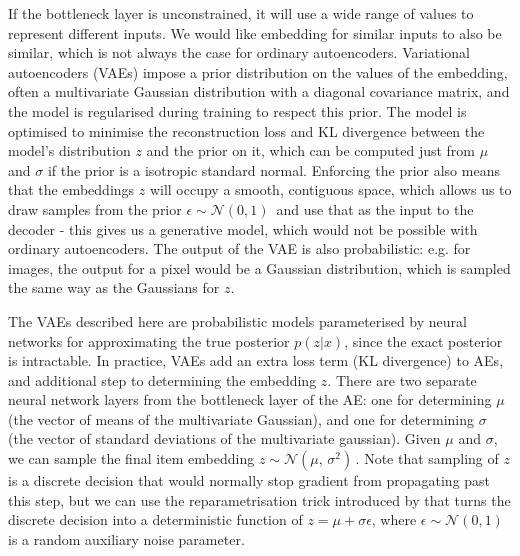 If the bottleneck layer is unconstrained, it will use a wide range of values to represent different inputs.
We would like embedding for similar inputs to also be similar, which is not always the case for ordinary autoencoders.
Variational autoencoders (VAEs) impose a prior distribution on the values of the embedding, often a multivariate Gaussian distribution with a diagonal covariance matrix, and the model is regularised during training to respect this prior.
The model is optimised to minimise the reconstruction loss and KL divergence between the model's distribution $z$ and the prior on it, which can be computed just from $\mu$ and $\sigma$ if the prior is a isotropic standard normal.
Enforcing the prior also means that the embeddings $z$ will occupy a smooth, contiguous space, which allows us to draw samples from the prior $\epsilon \sim \mathcal{N}(0, 1)\,$ and use that as the input to the decoder - this gives us a generative model, which would not be possible with ordinary autoencoders.
The output of the VAE is also probabilistic: e.g. for images, the output for a pixel would be a Gaussian distribution, which is sampled the same way as the Gaussians for $z$.

The VAEs described here are probabilistic models parameterised by neural networks for approximating the true posterior $p(z|x)$, since the exact posterior is intractable.
In practice, VAEs add an extra loss term (KL divergence) to AEs, and additional step to determining the embedding $z$.
There are two separate neural network layers from the bottleneck layer of the AE:  one for determining $\mu$ (the vector of means of the multivariate Gaussian), and one for determining $\sigma$ (the vector of standard deviations of the multivariate gaussian).
Given $\mu$ and $\sigma$, we can sample the final item embedding $z \sim \mathcal{N}(\mu,\,\sigma^{2})\,$.
Note that sampling of $z$ is a discrete decision that would normally stop gradient from propagating past this step, but we can use the reparametrisation trick introduced by \cite{vae} that turns the discrete decision into a deterministic function of $z = \mu + \sigma\epsilon$, where $\epsilon \sim \mathcal{N}(0, 1)\,$ is a random auxiliary noise parameter.


